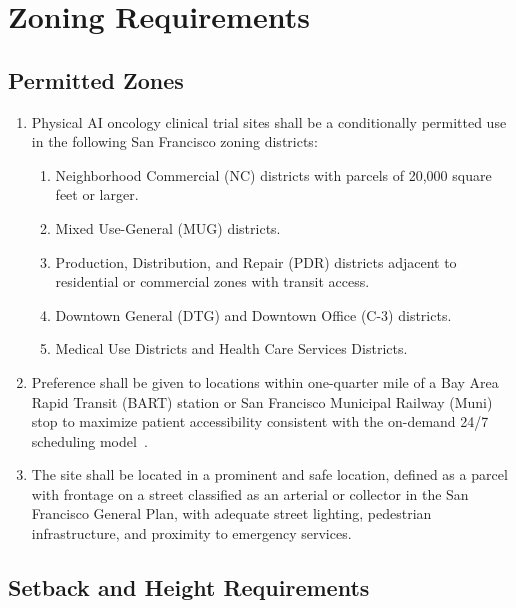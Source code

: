 \section{Zoning Requirements}

\subsection{Permitted Zones}

\begin{enumerate}[label=(\alph*)]
\item Physical AI oncology clinical trial sites shall be a conditionally
  permitted use in the following San Francisco zoning districts:
  \begin{enumerate}[label=(\arabic*)]
  \item Neighborhood Commercial (NC) districts with parcels of 20,000 square
    feet or larger.
  \item Mixed Use-General (MUG) districts.
  \item Production, Distribution, and Repair (PDR) districts adjacent to
    residential or commercial zones with transit access.
  \item Downtown General (DTG) and Downtown Office (C-3) districts.
  \item Medical Use Districts and Health Care Services Districts.
  \end{enumerate}

\item Preference shall be given to locations within one-quarter mile of a Bay
  Area Rapid Transit (BART) station or San Francisco Municipal Railway (Muni)
  stop to maximize patient accessibility consistent with the on-demand 24/7
  scheduling model~\cite{formatcomparison2026}.

\item The site shall be located in a prominent and safe location, defined as a
  parcel with frontage on a street classified as an arterial or collector in
  the San Francisco General Plan, with adequate street lighting, pedestrian
  infrastructure, and proximity to emergency services.
\end{enumerate}

\subsection{Setback and Height Requirements}

